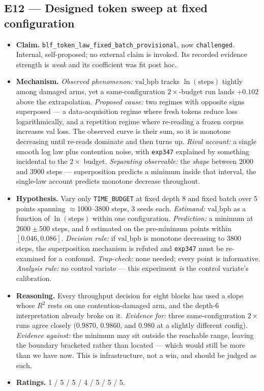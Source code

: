 \documentclass{article}
\newcommand{\vb}{\mathrm{val\_bpb}}
\begin{document}
\subsection{E12 --- Designed token sweep at fixed configuration}
\begin{itemize}\itemsep2pt
\item \textbf{Claim.} \texttt{blf\_token\_law\_fixed\_batch\_provisional}, now \texttt{challenged}. Internal, self-proposed; no external claim is invoked. Its recorded evidence strength is \emph{weak} and its coefficient was fit post hoc.
\item \textbf{Mechanism.} \emph{Observed phenomenon:} $\vb$ tracks $\ln(\text{steps})$ tightly among damaged arms, yet a same-configuration $2\times$-budget run lands $+0.102$ above the extrapolation. \emph{Proposed cause:} two regimes with opposite signs superposed --- a data-acquisition regime where fresh tokens reduce loss logarithmically, and a repetition regime where re-reading a frozen corpus increases val loss. The observed curve is their sum, so it is monotone decreasing until re-reads dominate and then turns up. \emph{Rival account:} a single smooth log law plus contention noise, with \texttt{exp347} explained by something incidental to the $2\times$ budget. \emph{Separating observable:} the \emph{shape} between 2000 and 3900 steps --- superposition predicts a minimum inside that interval, the single-law account predicts monotone decrease throughout.
\item \textbf{Hypothesis.} Vary only \texttt{TIME\_BUDGET} at fixed depth 8 and fixed batch over 5 points spanning $\approx$1000--3800 steps, 3 seeds each. \emph{Estimand:} $\vb$ as a function of $\ln(\text{steps})$ within one configuration. \emph{Prediction:} a minimum at $2600 \pm 500$ steps, and $b$ estimated on the pre-minimum points within $[0.046, 0.086]$. \emph{Decision rule:} if $\vb$ is monotone decreasing to 3800 steps, the superposition mechanism is refuted and \texttt{exp347} must be re-examined for a confound. \emph{Trap-check:} none needed; every point is informative. \emph{Analysis rule:} no control variate --- this experiment \emph{is} the control variate's calibration.
\item \textbf{Reasoning.} Every throughput decision for eight blocks has used a slope whose $R^2$ rests on one contention-damaged arm, and the depth-6 interpretation already broke on it. \emph{Evidence for:} three same-configuration $2\times$ runs agree closely ($0.9870$, $0.9860$, and $0.980$ at a slightly different config). \emph{Evidence against:} the minimum may sit outside the reachable range, leaving the boundary bracketed rather than located --- which would still be more than we have now. This is infrastructure, not a win, and should be judged as such.
\item \textbf{Ratings.} 1 / 5 / 5 / 4 / 5 / 5 / 5.
\end{itemize}
\end{document}
